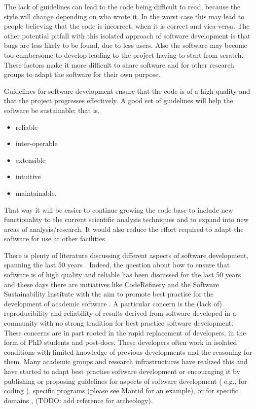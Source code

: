 \documentclass[jnr]{iosart2x}
\begin{document}
The lack of guidelines can lead to the code being difficult to read, because the style will change depending on who wrote it.
In the worst case this may lead to people believing that the code is incorrect, when it is correct and vica-versa.
The other potential pitfall with this isolated approach of software development is that bugs are less likely to be found, due to less users.
Also the software may become too cumbersome to develop leading to the project having to start from scratch.
These factors make it more difficult to share software and for other research groups to adapt the software for their own purpose.

Guidelines for software development ensure that the code is of a high quality and that the project progresses effectively.
A good set of guidelines will help the software be sustainable; that is,
\begin{itemize}
\item{reliable}
\item{inter-operable}
\item{extensible}
\item{intuitive}
\item{maintainable.}
\end{itemize}
That way it will be easier to continue growing the code base to include new functionality to the current scientific analysis techniques and to expand into new areas of analysis/research.
It would also reduce the effort required to adapt the software for use at other facilities.

There is plenty of literature discussing different aspects of software development, spanning the last 50 years \cite{ scientific_fortran, fair_software}.
Indeed, the question about how to ensure that software is of high quality and reliable has been discussed for the last 50 years \cite{scientific_fortran, fair_software} and these days there are initiatives like CodeRefinery \cite{coderefinery} and the Software Sustainability Institute \cite{SoftwareSustainabilityInstitute} with the aim to promote best practise for the development of academic software \cite{fair_software}. 
A particular concern is the (lack of) reproducibility and reliability of results derived from software developed in a community with no strong tradition for best practice software development. 
These concerns are in part rooted in the rapid replacement of developers, in the form of PhD students and post-docs.  
These developers often work in isolated conditions with limited knowledge of previous developments and the reasoning for them.
Many academic groups and research infrastructures have realized this and have started to adapt best practise software development or encouraging it by publishing or proposing guidelines for aspects of software development ( e.g., for coding \cite{Green_2011}), specific programs (please see Mantid \cite{mantidguidelines} for an example), or for specific domains \cite{medical-informatics}, \cite{Silvia_2017} (TODO: add reference for archeology).
\end{document}
